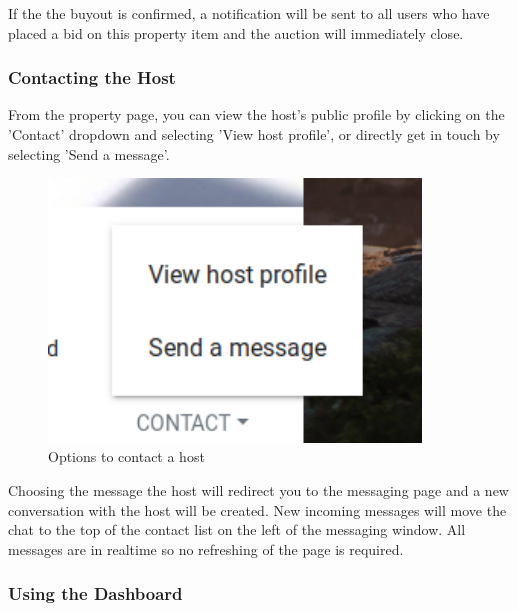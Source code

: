 If the the buyout is confirmed, a notification will be
sent to all users who have placed a bid on this property item and the auction
will immediately close.

\newpage
\subsubsection{Contacting the Host}
From the property page, you can view the host's public profile by clicking on
the 'Contact' dropdown and selecting 'View host profile', or directly get in
touch by selecting 'Send a message'.

\begin{figure}[!h]
  \centering
  \includegraphics[height=7cm]{assets/userManual/contactHost.png}
  \caption{Options to contact a host}
  \label{fig:contactHost}
\end{figure}

Choosing the message the host will redirect you to the messaging page and a new
conversation with the host will be created. New incoming messages will move the
chat to the top of the contact list on the left of the messaging window. All
messages are in realtime so no refreshing of the page is required.

\newpage
\subsubsection{Using the Dashboard}
